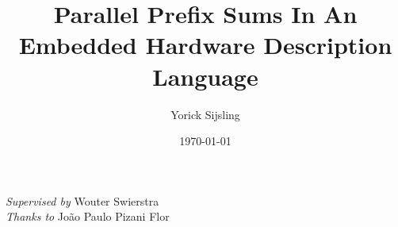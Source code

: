 \documentclass[a4paper]{article}
\title{Parallel Prefix Sums In An Embedded Hardware Description
Language}
\date{\today}
\author{Yorick Sijsling}
\begin{document}
\maketitle

\begin{flushright}
\emph{Supervised by} Wouter Swierstra\\
\emph{Thanks to} João Paulo Pizani Flor
\end{flushright}



\end{document}
